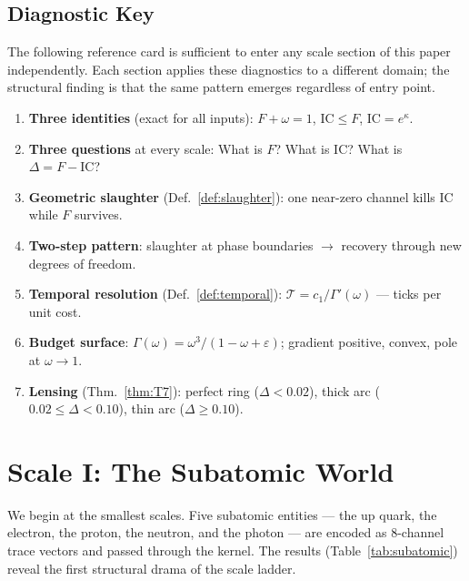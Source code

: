 \documentclass[
  aps,
  prd,
  twocolumn,
  superscriptaddress,
  nofootinbib,
  floatfix
]{revtex4-2}
\newcommand{\Gam}{\Gamma}
\newcommand{\eps}{\varepsilon}
\newcommand{\IC}{\mathrm{IC}}
\begin{document}
\subsection{Diagnostic Key}\label{sec:key}

The following reference card is sufficient to enter any scale
section of this paper independently.  Each section applies
these diagnostics to a different domain; the structural
finding is that the same pattern emerges regardless of entry
point.

\begin{enumerate}
\item \textbf{Three identities} (exact for all inputs):
  $F + \omega = 1$, \; $\IC \leq F$, \; $\IC = e^{\kappa}$.
\item \textbf{Three questions} at every scale:
  What is $F$?  What is $\IC$?  What is $\Delta = F - \IC$?
\item \textbf{Geometric slaughter}
  (Def.~\ref{def:slaughter}):
  one near-zero channel kills $\IC$ while $F$ survives.
\item \textbf{Two-step pattern}: slaughter at phase
  boundaries $\to$ recovery through new degrees of freedom.
\item \textbf{Temporal resolution}
  (Def.~\ref{def:temporal}):
  $\mathcal{T} = c_1/\Gam'(\omega)$ --- ticks per unit cost.
\item \textbf{Budget surface}: $\Gam(\omega)
  = \omega^3/(1 - \omega + \eps)$; gradient positive, convex,
  pole at $\omega \to 1$.
\item \textbf{Lensing} (Thm.~\ref{thm:T7}):
  perfect ring ($\Delta < 0.02$), thick arc
  ($0.02 \leq \Delta < 0.10$), thin arc ($\Delta \geq 0.10$).
\end{enumerate}


\section{Scale I: The Subatomic World}\label{sec:subatomic}

We begin at the smallest scales.  Five subatomic entities ---
the up quark, the electron, the proton, the neutron, and the
photon --- are encoded as 8-channel trace vectors and passed
through the kernel.  The results (Table~\ref{tab:subatomic})
reveal the first structural drama of the scale ladder.
\end{document}
